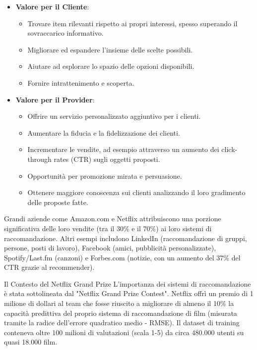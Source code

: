 \documentclass{article}
\begin{document}
\begin{itemize}
    \item \textbf{Valore per il Cliente}:
          \begin{itemize}
              \item Trovare item rilevanti rispetto ai propri interessi, spesso superando il sovraccarico informativo.
              \item Migliorare ed espandere l'insieme delle scelte possibili.
              \item Aiutare ad esplorare lo spazio delle opzioni disponibili.
              \item Fornire intrattenimento e scoperta.
          \end{itemize}
    \item \textbf{Valore per il Provider}:
          \begin{itemize}
              \item Offrire un servizio personalizzato aggiuntivo per i clienti.
              \item Aumentare la fiducia e la fidelizzazione dei clienti.
              \item Incrementare le vendite, ad esempio attraverso un aumento dei click-through rates (CTR) sugli oggetti proposti.
              \item Opportunità per promozione mirata e persuasione.
              \item Ottenere maggiore conoscenza sui clienti analizzando il loro gradimento delle proposte fatte.
          \end{itemize}
\end{itemize}
Grandi aziende come Amazon.com e Netflix attribuiscono una porzione significativa delle loro vendite (tra il 30\% e il 70\%) ai loro sistemi di raccomandazione. Altri esempi includono LinkedIn (raccomandazione di gruppi, persone, posti di lavoro), Facebook (amici, pubblicità personalizzate), Spotify/Last.fm (canzoni) e Forbes.com (notizie, con un aumento del 37\% del CTR grazie al recommender).

\begin{notebox}{Il Contesto del Netflix Grand Prize}
    L'importanza dei sistemi di raccomandazione è stata sottolineata dal "Netflix Grand Prize Contest". Netflix offrì un premio di 1 milione di dollari al team che fosse riuscito a migliorare di almeno il 10\% la capacità predittiva del proprio sistema di raccomandazione di film (misurata tramite la radice dell'errore quadratico medio - RMSE). Il dataset di training conteneva oltre 100 milioni di valutazioni (scala 1-5) da circa 480.000 utenti su quasi 18.000 film.
\end{notebox}
\end{document}
